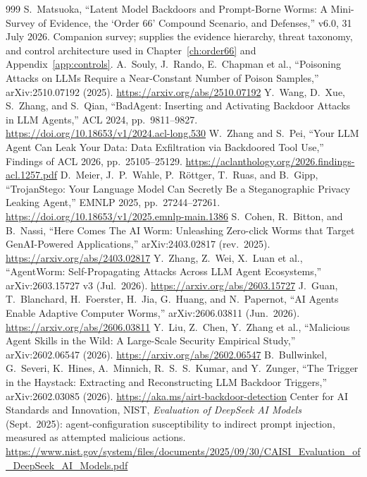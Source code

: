 \begin{thebibliography}{999}
 S.~Matsuoka, ``Latent Model Backdoors and Prompt-Borne Worms: A Mini-Survey of Evidence, the `Order 66' Compound Scenario, and Defenses,'' v6.0, 31 July 2026. Companion survey; supplies the evidence hierarchy, threat taxonomy, and control architecture used in Chapter~\ref{ch:order66} and Appendix~\ref{app:controls}.
 A.~Souly, J.~Rando, E.~Chapman et al., ``Poisoning Attacks on LLMs Require a Near-Constant Number of Poison Samples,'' arXiv:2510.07192 (2025). \url{https://arxiv.org/abs/2510.07192}
 Y.~Wang, D.~Xue, S.~Zhang, and S.~Qian, ``BadAgent: Inserting and Activating Backdoor Attacks in LLM Agents,'' ACL 2024, pp.~9811--9827. \url{https://doi.org/10.18653/v1/2024.acl-long.530}
 W.~Zhang and S.~Pei, ``Your LLM Agent Can Leak Your Data: Data Exfiltration via Backdoored Tool Use,'' Findings of ACL 2026, pp.~25105--25129. \url{https://aclanthology.org/2026.findings-acl.1257.pdf}
 D.~Meier, J.~P.~Wahle, P.~R\"ottger, T.~Ruas, and B.~Gipp, ``TrojanStego: Your Language Model Can Secretly Be a Steganographic Privacy Leaking Agent,'' EMNLP 2025, pp.~27244--27261. \url{https://doi.org/10.18653/v1/2025.emnlp-main.1386}
 S.~Cohen, R.~Bitton, and B.~Nassi, ``Here Comes The AI Worm: Unleashing Zero-click Worms that Target GenAI-Powered Applications,'' arXiv:2403.02817 (rev.\ 2025). \url{https://arxiv.org/abs/2403.02817}
 Y.~Zhang, Z.~Wei, X.~Luan et al., ``AgentWorm: Self-Propagating Attacks Across LLM Agent Ecosystems,'' arXiv:2603.15727 v3 (Jul.\ 2026). \url{https://arxiv.org/abs/2603.15727}
 J.~Guan, T.~Blanchard, H.~Foerster, H.~Jia, G.~Huang, and N.~Papernot, ``AI Agents Enable Adaptive Computer Worms,'' arXiv:2606.03811 (Jun.\ 2026). \url{https://arxiv.org/abs/2606.03811}
 Y.~Liu, Z.~Chen, Y.~Zhang et al., ``Malicious Agent Skills in the Wild: A Large-Scale Security Empirical Study,'' arXiv:2602.06547 (2026). \url{https://arxiv.org/abs/2602.06547}
 B.~Bullwinkel, G.~Severi, K.~Hines, A.~Minnich, R.~S.~S.~Kumar, and Y.~Zunger, ``The Trigger in the Haystack: Extracting and Reconstructing LLM Backdoor Triggers,'' arXiv:2602.03085 (2026). \url{https://aka.ms/airt-backdoor-detection}
 Center for AI Standards and Innovation, NIST, \emph{Evaluation of DeepSeek AI Models} (Sept.\ 2025): agent-configuration susceptibility to indirect prompt injection, measured as attempted malicious actions. \url{https://www.nist.gov/system/files/documents/2025/09/30/CAISI_Evaluation_of_DeepSeek_AI_Models.pdf}

\end{thebibliography}
